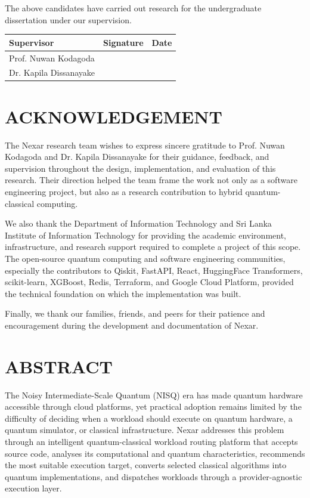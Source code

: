 \documentclass[12pt,a4paper]{report}
\begin{document}
\vspace{0.5cm}
The above candidates have carried out research for the undergraduate dissertation under our supervision.

\vspace{1cm}
\begin{longtable}{p{}p{}p{}}
\toprule
\textbf{Supervisor} & \textbf{Signature} & \textbf{Date} \\
\midrule
Prof. Nuwan Kodagoda & & \\
\addlinespace[1.2cm]
Dr. Kapila Dissanayake & & \\
\bottomrule
\end{longtable}

\chapter*{ACKNOWLEDGEMENT}
The Nexar research team wishes to express sincere gratitude to Prof. Nuwan Kodagoda and Dr. Kapila Dissanayake for their guidance, feedback, and supervision throughout the design, implementation, and evaluation of this research. Their direction helped the team frame the work not only as a software engineering project, but also as a research contribution to hybrid quantum-classical computing.

We also thank the Department of Information Technology and Sri Lanka Institute of Information Technology for providing the academic environment, infrastructure, and research support required to complete a project of this scope. The open-source quantum computing and software engineering communities, especially the contributors to Qiskit, FastAPI, React, HuggingFace Transformers, scikit-learn, XGBoost, Redis, Terraform, and Google Cloud Platform, provided the technical foundation on which the implementation was built.

Finally, we thank our families, friends, and peers for their patience and encouragement during the development and documentation of Nexar.

\chapter*{ABSTRACT}
The Noisy Intermediate-Scale Quantum (NISQ) era has made quantum hardware accessible through cloud platforms, yet practical adoption remains limited by the difficulty of deciding when a workload should execute on quantum hardware, a quantum simulator, or classical infrastructure. Nexar addresses this problem through an intelligent quantum-classical workload routing platform that accepts source code, analyses its computational and quantum characteristics, recommends the most suitable execution target, converts selected classical algorithms into quantum implementations, and dispatches workloads through a provider-agnostic execution layer.
\end{document}
